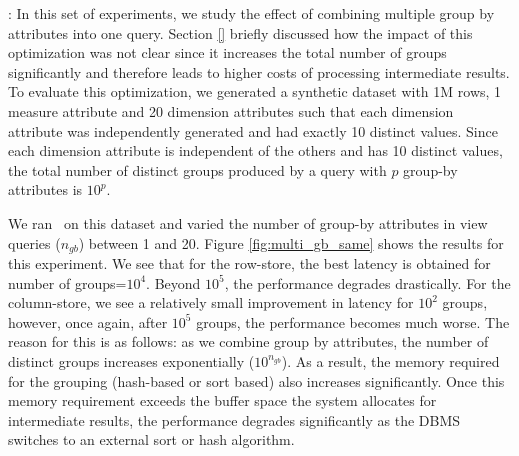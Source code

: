 : In this set of experiments, we
study the effect of combining multiple group by attributes into one query.
Section \ref{} briefly discussed how the impact of this optimization was not
clear since it increases the total number of groups significantly and therefore
leads to higher costs of processing intermediate results.
To evaluate this optimization, we generated a synthetic dataset with 1M rows, 1
measure attribute and 20 dimension attributes such that each dimension attribute
was independently generated and had exactly 10 distinct values.   
Since each dimension attribute is independent of the others and has 10 distinct
values, the total number of distinct groups produced by a query
with $p$ group-by attributes is $10^p$.  

We ran \VizRecDB\ on this dataset and varied the number of group-by
attributes in view queries ($n_{gb}$) between 1 and 20.
Figure \ref{fig:multi_gb_same} shows the results for this experiment.
We see that for the row-store, the best latency is obtained for number of
groups=$10^4$.
Beyond $10^5$, the performance degrades drastically.   
For the column-store, we see a relatively small improvement in latency
for $10^2$ groups, however, once again, after $10^5$ groups, the performance
becomes much worse.
The reason for this is as follows: as we combine group by attributes, the number
of distinct groups increases exponentially ($10^{n_{gb}}$). 
As a result, the memory required for the grouping (hash-based or sort based)
also increases significantly.
Once this memory requirement exceeds the buffer space the system allocates for intermediate results, the
performance degrades significantly as the DBMS switches to an external sort or hash algorithm.


